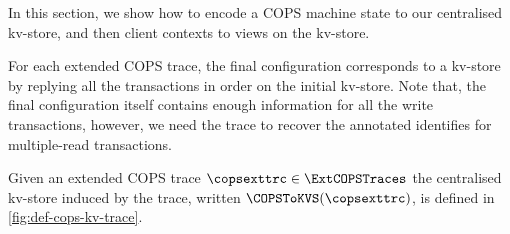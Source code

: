 In this section,
we show how to encode a COPS machine state to our centralised kv-store,
and then client contexts to views on the kv-store.

For each extended COPS trace,
the final configuration corresponds to a kv-store by replying all the transactions in order
on the initial kv-store.
Note that, the final configuration itself contains enough information for all the write transactions,
however, we need the trace to recover the annotated identifies for multiple-read transactions.

\begin{definition}
Given an extended COPS trace \( \copsexttrc \in \ExtCOPSTraces \) 
the centralised kv-store induced by the trace, written \( \COPSToKVS(\copsexttrc) \), is defined in \cref{fig:def-cops-kv-trace}.

\end{definition}

